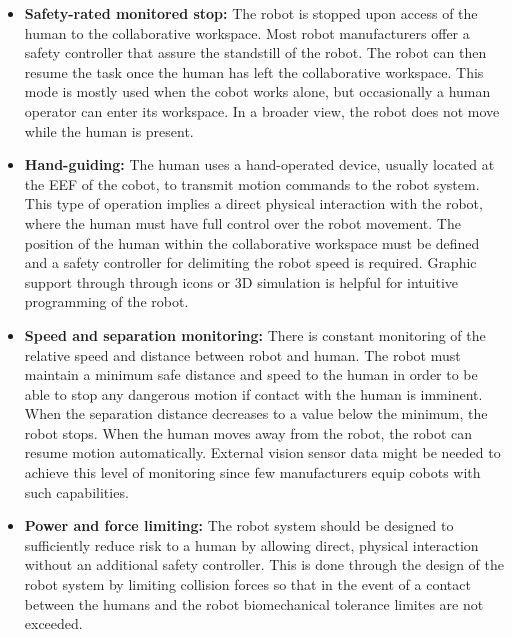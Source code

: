 

\begin{itemize}
    \item \textbf{Safety-rated monitored stop: }The robot is stopped upon access of the human to the collaborative workspace. Most robot manufacturers offer a safety controller that assure the standstill of the robot. The robot can then resume the task once the human has left the collaborative workspace. This mode is mostly used when the cobot works alone, but occasionally a human operator can enter its workspace. In a broader view, the robot does not move while the human is present.
    \item \textbf{Hand-guiding: }The human uses a hand-operated device, usually located at the EEF of the cobot, to transmit motion commands to the robot system. This type of operation implies a direct physical interaction with the robot, where the human must have full control over the robot movement. The position of the human within the collaborative workspace must be defined and a safety controller for delimiting the robot speed is required. Graphic support through through icons or 3D simulation is helpful for intuitive programming of the robot.
    \item \textbf{Speed and separation monitoring: }There is constant monitoring of the relative speed and distance between robot and human. The robot must maintain a minimum safe distance and speed to the human in order to be able to stop any dangerous motion if contact with the human is imminent. When the separation distance decreases to a value below the minimum, the robot stops. When the human moves away from the robot, the robot can resume motion automatically. External vision sensor data might be needed to achieve this level of monitoring since few manufacturers equip cobots with such capabilities. 
    \item \textbf{Power and force limiting: }The robot system should be designed to sufficiently reduce risk to a human by allowing direct, physical interaction without an additional safety controller. This is done through the design of the robot system by limiting collision forces so that in the event of a contact between the humans and the robot biomechanical tolerance limites are not exceeded.
\end{itemize}

